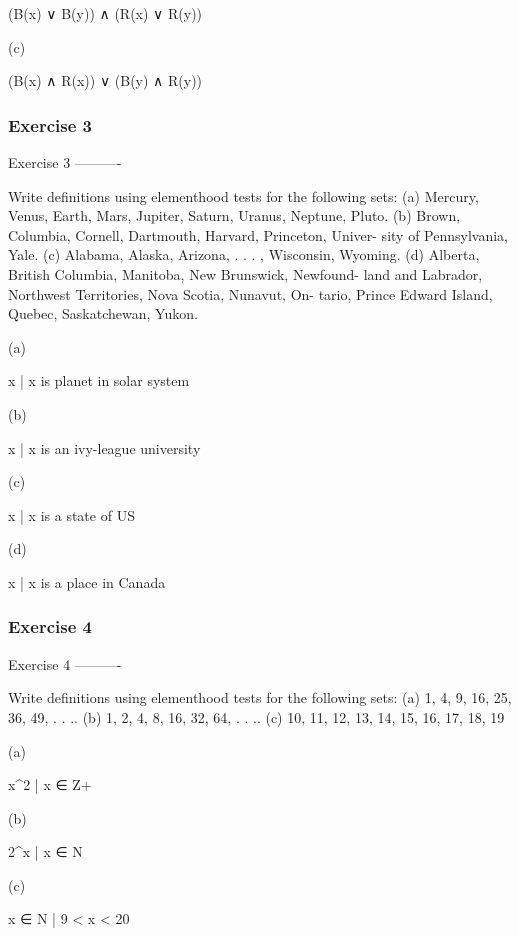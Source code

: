     (B(x) ∨ B(y)) ∧ (R(x) ∨ R(y))

(c)

    (B(x) ∧ R(x)) ∨ (B(y) ∧ R(y))

\subsubsection{Exercise 3}
Exercise 3
----------

    Write definitions using elementhood tests for the following sets:
    (a) {Mercury, Venus, Earth, Mars, Jupiter, Saturn, Uranus, Neptune,
    Pluto}.
    (b) {Brown, Columbia, Cornell, Dartmouth, Harvard, Princeton, Univer-
    sity of Pennsylvania, Yale}.
    (c) {Alabama, Alaska, Arizona, . . . , Wisconsin, Wyoming}.
    (d) {Alberta, British Columbia, Manitoba, New Brunswick, Newfound-
    land and Labrador, Northwest Territories, Nova Scotia, Nunavut, On-
    tario, Prince Edward Island, Quebec, Saskatchewan, Yukon}.

(a)

    {x | x is planet in solar system}

(b)

    {x | x is an ivy-league university }

(c)

    {x | x is a state of US}

(d)

    {x | x is a place in Canada}

\subsubsection{Exercise 4}
Exercise 4
----------

    Write definitions using elementhood tests for the following sets:
    (a) {1, 4, 9, 16, 25, 36, 49, . . .}.
    (b) {1, 2, 4, 8, 16, 32, 64, . . .}.
    (c) {10, 11, 12, 13, 14, 15, 16, 17, 18, 19}

(a)

    {x^2 | x ∈ Z+}

(b)

    {2^x | x ∈ N}

(c)

    {x ∈ N | 9 < x < 20}

